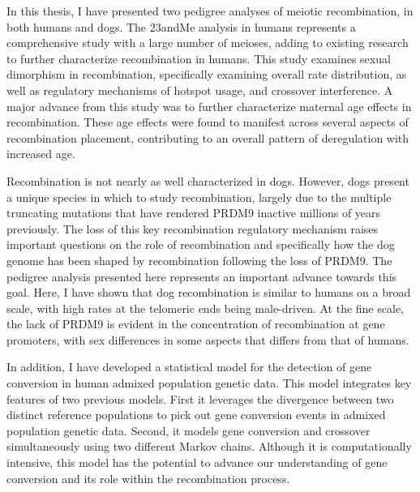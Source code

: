 



In this thesis, I have presented two pedigree analyses of meiotic recombination, in both humans and dogs.
The 23andMe analysis in humans represents a comprehensive study with a large number of meioses, adding to existing research to further characterize recombination in humans. %
This study examines sexual dimorphism in recombination, specifically examining overall rate distribution, as well as regulatory mechanisms of hotspot usage, and crossover interference.
A major advance from this study was to further characterize maternal age effects in recombination.
These age effects were found to manifest across several aspects of recombination placement, contributing to an overall pattern of deregulation with increased age.

Recombination is not nearly as well characterized in dogs.
However, dogs present a unique species in which to study recombination, largely due to the multiple truncating mutations that have rendered PRDM9 inactive millions of years previously.
The loss of this key recombination regulatory mechanism raises important questions on the role of recombination and specifically how the dog genome has been shaped by recombination following the loss of PRDM9.
The pedigree analysis presented here represents an important advance towards this goal.
Here, I have shown that dog recombination is similar to humans on a broad scale, with high rates at the telomeric ends being male-driven.
At the fine scale, the lack of PRDM9 is evident in the concentration of recombination at gene promoters, with sex differences in some aspects that differs from that of humans.

In addition, I have developed a statistical model for the detection of gene conversion in human admixed population genetic data.
This model integrates key features of two previous models.
First it leverages the divergence between two distinct reference populations to pick out gene conversion events in admixed population genetic data.
Second, it models gene conversion and crossover simultaneously using two different Markov chains.
Although it is computationally intensive, this model has the potential to advance our understanding of gene conversion and its role within the recombination process.

